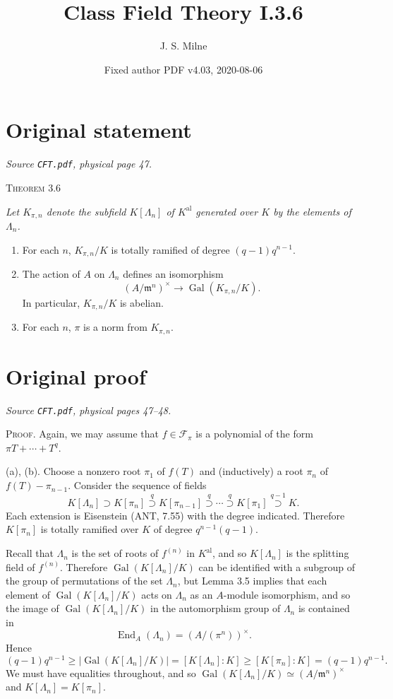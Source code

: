 \documentclass[11pt,a4paper]{article}
\title{Class Field Theory I.3.6}
\author{J. S. Milne}
\date{Fixed author PDF v4.03, 2020-08-06}
\begin{document}
\maketitle

\section*{Original statement}
\noindent\emph{Source \texttt{CFT.pdf}, physical page 47.}\par\medskip
\noindent\textsc{Theorem 3.6}
{\itshape Let $K_{\pi,n}$ denote the subfield $K[\Lambda_n]$ of
$K^{\mathrm{al}}$ generated over $K$ by the elements of $\Lambda_n$.
\begin{enumerate}
\renewcommand{\labelenumi}{(\alph{enumi})}
\item For each $n$, $K_{\pi,n}/K$ is totally ramified of degree $(q-1)q^{n-1}$.
\item The action of $A$ on $\Lambda_n$ defines an isomorphism
\[
(A/\mathfrak m^n)^\times\longrightarrow\operatorname{Gal}(K_{\pi,n}/K).
\]
In particular, $K_{\pi,n}/K$ is abelian.
\item For each $n$, $\pi$ is a norm from $K_{\pi,n}$.
\end{enumerate}}

\section*{Original proof}
\noindent\emph{Source \texttt{CFT.pdf}, physical pages 47--48.}\par\medskip
\noindent\textsc{Proof.} Again, we may assume that $f\in\mathcal F_\pi$
is a polynomial of the form $\pi T+\cdots+T^q$.

(a), (b). Choose a nonzero root $\pi_1$ of $f(T)$ and (inductively) a root
$\pi_n$ of $f(T)-\pi_{n-1}$. Consider the sequence of fields
\[
K[\Lambda_n]\supset K[\pi_n]\overset{q}{\supset}K[\pi_{n-1}]
 \overset{q}{\supset}\cdots\overset{q}{\supset}K[\pi_1]
 \overset{q-1}{\supset}K.
\]
\noindent Each extension is Eisenstein (ANT, 7.55) with the degree indicated.
Therefore $K[\pi_n]$ is totally ramified over $K$ of degree $q^{n-1}(q-1)$.

Recall that $\Lambda_n$ is the set of roots of $f^{(n)}$ in $K^{\mathrm{al}}$,
and so $K[\Lambda_n]$ is the splitting field of $f^{(n)}$. Therefore
$\operatorname{Gal}(K[\Lambda_n]/K)$ can be identified with a subgroup of
the group of permutations of the set $\Lambda_n$, but Lemma 3.5 implies
that each element of $\operatorname{Gal}(K[\Lambda_n]/K)$ acts on $\Lambda_n$
as an $A$-module isomorphism, and so the image of
$\operatorname{Gal}(K[\Lambda_n]/K)$ in the automorphism group of $\Lambda_n$
is contained in
\[
\operatorname{End}_A(\Lambda_n)=(A/(\pi^n))^\times.
\]
Hence
\[
(q-1)q^{n-1}\geq
 |\operatorname{Gal}(K[\Lambda_n]/K)|=[K[\Lambda_n]:K]
 \geq[K[\pi_n]:K]=(q-1)q^{n-1}.
\]
We must have equalities throughout, and so
$\operatorname{Gal}(K[\Lambda_n]/K)\simeq(A/\mathfrak m^n)^\times$
and $K[\Lambda_n]=K[\pi_n]$.
\end{document}
